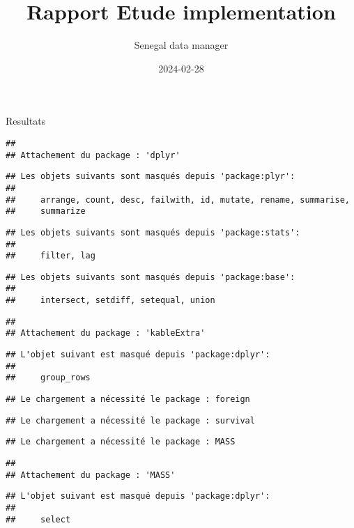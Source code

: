 \documentclass[
]{article}
\title{Rapport Etude implementation}
\author{Senegal data manager}
\date{2024-02-28}
\begin{document}
\maketitle

Resultats

\begin{verbatim}
## 
## Attachement du package : 'dplyr'
\end{verbatim}

\begin{verbatim}
## Les objets suivants sont masqués depuis 'package:plyr':
## 
##     arrange, count, desc, failwith, id, mutate, rename, summarise,
##     summarize
\end{verbatim}

\begin{verbatim}
## Les objets suivants sont masqués depuis 'package:stats':
## 
##     filter, lag
\end{verbatim}

\begin{verbatim}
## Les objets suivants sont masqués depuis 'package:base':
## 
##     intersect, setdiff, setequal, union
\end{verbatim}

\begin{verbatim}
## 
## Attachement du package : 'kableExtra'
\end{verbatim}

\begin{verbatim}
## L'objet suivant est masqué depuis 'package:dplyr':
## 
##     group_rows
\end{verbatim}

\begin{verbatim}
## Le chargement a nécessité le package : foreign
\end{verbatim}

\begin{verbatim}
## Le chargement a nécessité le package : survival
\end{verbatim}

\begin{verbatim}
## Le chargement a nécessité le package : MASS
\end{verbatim}

\begin{verbatim}
## 
## Attachement du package : 'MASS'
\end{verbatim}

\begin{verbatim}
## L'objet suivant est masqué depuis 'package:dplyr':
## 
##     select
\end{verbatim}
\end{document}
